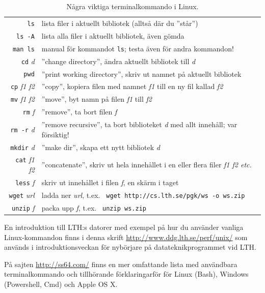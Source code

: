 \begin{table}[H]
\renewcommand{\arraystretch}{1.15}
   
\begin{tabular}{@{}r | l}
\texttt{ls} & lista filer i aktuellt bibliotek (alltså där du ''står'')\\
\texttt{ls -A} & lista alla filer i aktuellt bibliotek, även gömda \\
\texttt{man ls} & manual för kommandot \texttt{ls}; testa även för andra kommandon! \\
\texttt{cd} \textit{d} & ''change directory'', ändra aktuellt bibliotek till \textit{d}\\
\texttt{pwd} & ''print working directory'', skriv ut namnet på aktuellt bibliotek \\
\texttt{cp} \textit{f1 f2} & ''copy'', kopiera filen med namnet \textit{f1} till en ny fil kallad \textit{f2} \\
\texttt{mv} \textit{f1 f2} & ''move'', byt namn på filen \textit{f1} till \textit{f2}  \\
\texttt{rm} \textit{f} & ''remove'', ta bort filen \textit{f}\\
\texttt{rm -r} \textit{d} & ''remove recursive'', ta bort biblioteket \textit{d} med allt innehåll; var försiktig!\\
\texttt{mkdir} \textit{d} & ''make dir'', skapa ett nytt bibliotek \textit{d}\\
\texttt{cat} \textit{f1 f2}& ''concatenate'', skriv ut hela innehållet i en eller flera filer \textit{f1 f2 etc.}\\
\texttt{less} \textit{f}& skriv ut innehållet i filen \textit{f}, en skärm i taget\\
\texttt{wget} \textit{url}&ladda ner \textit{url}, t.ex. \texttt{ wget http://cs.lth.se/pgk/ws -o ws.zip}\\
\texttt{unzip} \textit{f}& packa upp \textit{f}, t.ex. \texttt{ unzip ws.zip}\\
\end{tabular}

    \caption{Några viktiga terminalkommando i Linux.}
    \label{fig:terminal:commands}

\end{table}

\noindent En introduktion till LTH:s datorer med exempel på hur du använder vanliga Linux-kommandon finns i denna skrift \url{http://www.ddg.lth.se/perf/unix/} som används i introduktionsveckan för nybörjare på datateknikprogrammet vid LTH.

På sajten \url{http://ss64.com/} finns en mer omfattande lista med användbara terminalkommando och tillhörande förklaringarför för Linux (Bash), Windows (Powershell, Cmd) och Apple OS X.  